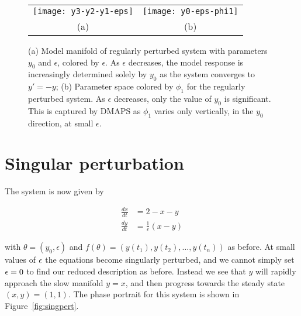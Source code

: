 \begin{figure}[ht!]
  \centering
  \begin{tabular}{cc}
    \texttt{[image: y3-y2-y1-eps]} &
                                                           \texttt{[image: y0-eps-phi1]} \\
    (a) & (b)\\
  \end{tabular}
  \caption{(a) Model manifold of regularly perturbed system with
    parameters $y_0$ and $\epsilon$, colored by $\epsilon$. As
    $\epsilon$ decreases, the model response is increasingly
    determined solely by $y_0$ as the system converges to $y' = -y$;
    (b) Parameter space colored by $\phi_1$ for the regularly
    perturbed system. As $\epsilon$ decreases, only the value of $y_0$
    is significant. This is captured by DMAPS as $\phi_1$ varies only
    vertically, in the $y_0$ direction, at small
    $\epsilon$. \label{fig:regpert}}
\end{figure}


\section{Singular perturbation}

The system is now given by

\begin{align}
  \frac{dx}{dt}&=2-x-y\\
  \frac{dy}{dt}&= \frac{1}{\epsilon}(x-y)
\end{align}    

with $\theta = (y_0, \epsilon)$ and
$f(\theta) = \left(y(t_1), y(t_2), \dots, y(t_n) \right)$ as
before. At small values of $\epsilon$ the equations become singularly
perturbed, and we cannot simply set $\epsilon = 0$ to find our reduced
description as before. Instead we see that $y$ will rapidly approach
the slow manifold $y = x$, and then progress towards the steady state
$(x,y) = (1,1)$. The phase portrait for this system is shown in
Figure~\ref{fig:singpert}.

